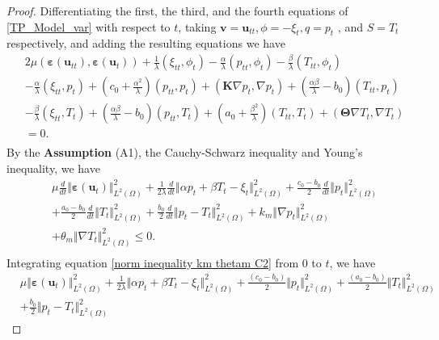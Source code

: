\documentclass{article}
\numberwithin{equation}{section}
\begin{document}
\begin{proof}
Differentiating the first, the third, and the fourth equations of \eqref{TP_Model_var} with respect to $t$,
 taking $\bm v = \bm u_{tt} ,\phi = - \xi_t, q = p_t$ , and $S = T_t$  respectively, and adding the resulting equations we have
\begin{equation}    
\begin{aligned} 
&2\mu(\bm\varepsilon( \bm u_{tt}),\bm\varepsilon( \bm u_t))
 +\frac{1}{\lambda}(  \xi_{tt}, \phi_t)
 -\frac{\alpha}{\lambda}(  p_{tt}, \phi_t)
 -\frac{\beta}{\lambda}(  T_{tt}, \phi_t)\\
& -\frac\alpha\lambda(  \xi_{tt} , p_t)+(c_0+\frac{\alpha^2}{\lambda})(  p_{tt} , p_t)+(\bm K \nabla p_t,\nabla p_t)+ (\frac{\alpha\beta}{\lambda}-b_0)(  T_{tt} , p_t)\\
& -\frac\beta\lambda(  \xi_{tt} , T_t)+(\frac{\alpha\beta}{\lambda}-b_0)(  p_{tt} , T_t)+(a_0+\frac{\beta^2}{\lambda})(  T_{tt} , T_t)   
  +(\bm\Theta\nabla T_t,\nabla T_t)\\
&=   0.\\
\end{aligned}
\end{equation}
By the \textbf{Assumption} (A1), the Cauchy-Schwarz inequality and Young's inequality, we have
\begin{equation}\label{norm inequality km thetam C2}
\begin{aligned} 
&  \mu\frac{d}{dt}\Vert\bm\varepsilon( \bm u_t)\Vert_{L^2(\Omega)}^2  
  +\frac1{2 \lambda}\frac{d}{dt}\Vert\alpha  p_t+\beta  T_t- \xi_t\Vert_{L^2(\Omega)}^2
  +\frac{c_0-b_0}{2}\frac{d}{dt} \Vert p_t\Vert_{L^2(\Omega)}^2  
 \\
&+\frac{a_0-b_0}{2}\frac{d}{dt} \Vert T_t\Vert_{L^2(\Omega)}^2 + \frac{b_0}{2} \frac{d}{dt} \Vert  p_t- T_t\Vert_{L^2(\Omega)}^2  
+ k_m\Vert\nabla  p_t\Vert_{L^2(\Omega)}^2
 \\
&+\theta_m \Vert\nabla T_t\Vert_{L^2(\Omega)}^2\le   0.\\
\end{aligned}
\end{equation}
 Integrating equation \eqref{norm inequality km thetam C2} from 0 to $t$, we have
\begin{equation}    
\begin{aligned} 
&   \mu\Vert\bm\varepsilon( \bm u_t)\Vert_{L^2(\Omega)}^2  
  +\frac1{ 2\lambda}\Vert\alpha  p_t+\beta  T_t- \xi_t\Vert_{L^2(\Omega)}^2
  +\frac{(c_0-b_0)}2 \Vert p_t\Vert_{L^2(\Omega)}^2  
 +\frac{(a_0-b_0)}2 \Vert T_t\Vert_{L^2(\Omega)}^2 \\
&+ \frac{b_0}2  \Vert  p_t- T_t\Vert_{L^2(\Omega)}^2  

\end{aligned}
\end{equation}
\end{proof}
\end{document}
